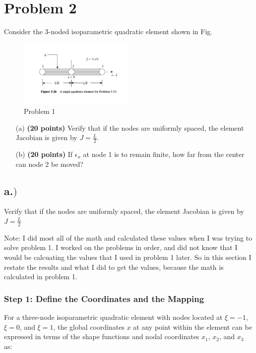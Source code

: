\section*{Problem 2}
Consider the 3-noded isoparametric quadratic element shown in Fig.

\begin{figure}[h!]
    \centering
    \includegraphics[width=0.5\textwidth]{figure_1.png}  %
    \caption{Problem 1}
    \label{fig:element}
\end{figure}

\begin{enumerate}
    \item[(a)] \textbf{(20 points)} Verify that if the nodes are uniformly spaced, the element Jacobian is given by \( J = \frac{L}{2} \).

    
    \item[(b)] \textbf{(20 points)} If \( \epsilon_x \) at node 1 is to remain finite, how far from the center can node 2 be moved?
 
\end{enumerate}


\subsection*{a.$)$}
 Verify that if the nodes are uniformly spaced, the element Jacobian is given by $J = \frac{L}{2}$

Note: I did most all of the math and calculated these values when I was trying to solve problem 1. I worked on the problems in order, and did not know that I would be calcuating the values that I used in problem 1 later. So in this section I restate the results and what
I did to get the values, because the math is calculated in problem 1.

\subsubsection*{Step 1: Define the Coordinates and the Mapping}
For a three-node isoparametric quadratic element with nodes located at \(\xi = -1\), \(\xi = 0\), and \(\xi = 1\), the global coordinates \( x \) at any point within the element can be expressed in terms of the shape functions and nodal coordinates \( x_1 \), \( x_2 \), and \( x_3 \) as:

